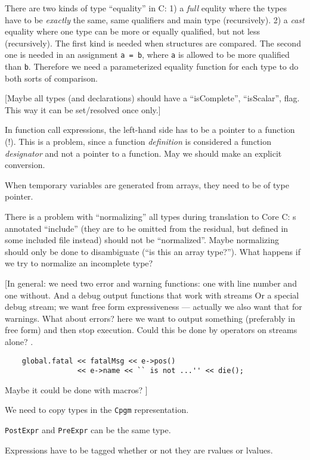 \begin{docpart}
There are two kinds of type ``equality'' in C: 1) a \emph{full}
equlity where the types have to be \emph{exactly} the same, \ie same
qualifiers and main type (recursively). 2) a \emph{cast} equality
where one type can be more or equally qualified, but not less
(recursively).  The first kind is needed when \eg structures are
compared. The second one is needed in \eg an assignment \texttt{a =
  b}, where \texttt{a} is allowed to be more qualified than
\texttt{b}. Therefore we need a parameterized equality function for
each type to do both sorts of comparison.

[Maybe all types (and declarations) should have a ``isComplete'',
``isScalar'', \etc flag. This way it can be set/resolved once only.]

In function call expressions, the left-hand side has to be a pointer
to a function (!). This is a problem, since a function
\emph{definition} is considered a function \emph{designator} and not a
pointer to a function. May we should make an explicit conversion.

When temporary variables are generated from arrays, they need to be of
type pointer.

There is a problem with ``normalizing'' all types during translation
to Core C: s annotated ``include'' (\ie they are to be
omitted from the residual, but defined in some included file instead)
should not be ``normalized''. Maybe normalizing should only be done to
disambiguate (\eg ``is this an array type?''). What happens if we try
to normalize an incomplete type?

[In general: we need two error and warning functions: one with line
number and one without. And a debug output functions that work with
streams Or a special debug stream; we want free form expressiveness
--- actually we also want that for warnings. What about errors? here
we want to output something (preferably in free form) and then stop
execution. Could this be done by operators on streams alone? \eg.

\begin{verbatim}
    global.fatal << fatalMsg << e->pos()
                 << e->name << `` is not ...'' << die();
\end{verbatim}
Maybe it could be done with macros?
]

We need to copy types in the \texttt{Cpgm} representation.

\texttt{PostExpr} and \texttt{PreExpr} can be the same type.

Expressions have to be tagged whether or not they are rvalues or
lvalues.


\end{docpart}
